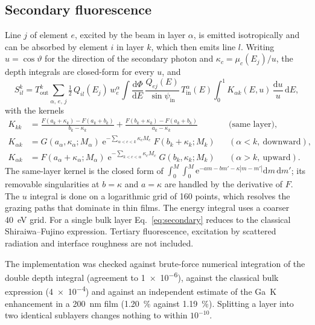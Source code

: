 \documentclass[11pt,a4paper]{article}
\newcommand{\dd}{\mathrm{d}}
\newcommand{\e}{\mathrm{e}}
\begin{document}
\subsection{Secondary fluorescence}
Line $j$ of element $e$, excited by the beam in layer $\alpha$, is emitted isotropically and can be
absorbed by element $i$ in layer $k$, which then emits line $l$. Writing $u=\cos\vartheta$ for the
direction of the secondary photon and $\kappa_c = \mu_c(E_j)/u$, the depth integrals are closed-form
for every $u$, and \citep{Shiraiwa1966,Mantler1986,deBoer1990}
\begin{equation}
S^k_{il} = T^k_\mathrm{out}\sum_{\alpha,\,e,\,j}\tfrac12\,Q_{il}(E_j)\,w^\alpha_e
\int\frac{\dd\Phi}{\dd E}\,\frac{Q_{ej}(E)}{\sin\psi_\mathrm{in}}\,T^\alpha_\mathrm{in}(E)
\int_0^1 K_{\alpha k}(E,u)\,\frac{\dd u}{u}\,\dd E ,
\label{eq:secondary}
\end{equation}
with the kernels
\begin{align}
K_{kk} &= \frac{F(a_k+\kappa_k)-F(a_k+b_k)}{b_k-\kappa_k} + \frac{F(b_k+\kappa_k)-F(a_k+b_k)}{a_k-\kappa_k}
&&\text{(same layer)},\nonumber\\
K_{\alpha k} &= G(a_\alpha,\kappa_\alpha;M_\alpha)\;\e^{-\sum_{\alpha<c<k}\kappa_cM_c}\;F(b_k+\kappa_k;M_k)
&&(\alpha<k,\ \text{downward}),\label{eq:kernels}\\
K_{\alpha k} &= F(a_\alpha+\kappa_\alpha;M_\alpha)\;\e^{-\sum_{k<c<\alpha}\kappa_cM_c}\;G(b_k,\kappa_k;M_k)
&&(\alpha>k,\ \text{upward}).\nonumber
\end{align}
The same-layer kernel is the closed form of
$\int_0^M\!\int_0^M \e^{-am-bm'-\kappa|m-m'|}\dd m\,\dd m'$; its removable singularities at $b=\kappa$
and $a=\kappa$ are handled by the derivative of $F$. The $u$ integral is done on a logarithmic grid
of 160 points, which resolves the grazing paths that dominate in thin films. The energy integral
uses a coarser \qty{40}{eV} grid. For a single bulk layer Eq.~\eqref{eq:secondary} reduces to the
classical Shiraiwa--Fujino expression. Tertiary fluorescence, excitation by scattered radiation and
interface roughness are not included.

The implementation was checked against brute-force numerical integration of the double depth integral
(agreement to \num{1e-6}), against the classical bulk expression (\num{4e-4}) and against an independent
estimate of the Ga~K enhancement in a \qty{200}{nm} film (\qty{1.20}{\percent} against \qty{1.19}{\percent}).
Splitting a layer into two identical sublayers changes nothing to within $10^{-10}$.
\end{document}
